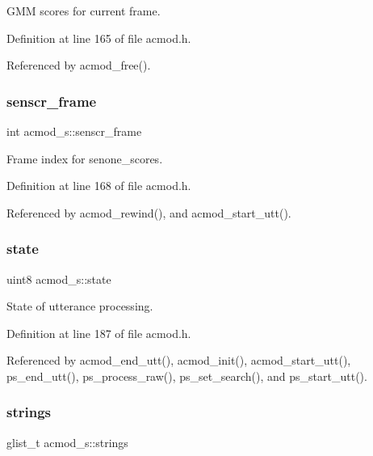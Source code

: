 G\+MM scores for current frame. 



Definition at line 165 of file acmod.\+h.



Referenced by acmod\+\_\+free().

\mbox{\label{structacmod__s_ab70ba4caf96b656936d499247e921f00}} 
\subsubsection{senscr\+\_\+frame}
{\footnotesize\ttfamily int acmod\+\_\+s\+::senscr\+\_\+frame}



Frame index for senone\+\_\+scores. 



Definition at line 168 of file acmod.\+h.



Referenced by acmod\+\_\+rewind(), and acmod\+\_\+start\+\_\+utt().

\mbox{\label{structacmod__s_a06adf606c11e6f4b9869742510a5c23b}} 
\subsubsection{state}
{\footnotesize\ttfamily uint8 acmod\+\_\+s\+::state}



State of utterance processing. 



Definition at line 187 of file acmod.\+h.



Referenced by acmod\+\_\+end\+\_\+utt(), acmod\+\_\+init(), acmod\+\_\+start\+\_\+utt(), ps\+\_\+end\+\_\+utt(), ps\+\_\+process\+\_\+raw(), ps\+\_\+set\+\_\+search(), and ps\+\_\+start\+\_\+utt().

\mbox{\label{structacmod__s_a9f6b699a0fbd43cf7ababab6f0ab81be}} 
\subsubsection{strings}
{\footnotesize\ttfamily glist\+\_\+t acmod\+\_\+s\+::strings}



